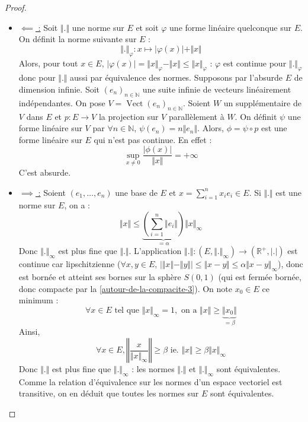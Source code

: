 	\begin{proof}
		\begin{itemize}
			\item \underline{$\impliedby$ :} Soit $\Vert . \Vert$ une norme sur $E$ et soit $\varphi$ une forme linéaire quelconque sur $E$. On définit la norme suivante sur $E$ :
			\[ \Vert . \Vert_{\varphi} : x \mapsto \vert \varphi(x) \vert + \Vert x \Vert \]
			Alors, pour tout $x \in E$, $\vert \varphi(x) \vert = \Vert x \Vert_{\varphi} - \Vert x \Vert \leq \Vert x \Vert_{\varphi}$ : $\varphi$ est continue pour $\Vert . \Vert_{\varphi}$ donc pour $\Vert . \Vert$ aussi par équivalence des normes.
			\newpar
			Supposons par l'absurde $E$ de dimension infinie. Soit $(e_n)_{n \in \mathbb{N}}$ une suite infinie de vecteurs linéairement indépendantes. On pose $V = \operatorname{Vect}(e_n)_{n \in \mathbb{N}}$. Soient $W$ un supplémentaire de $V$ dans $E$ et $p : E \rightarrow V$ la projection sur $V$ parallèlement à $W$. On définit $\psi$ une forme linéaire sur $V$ par $\forall n \in \mathbb{N}$, $\psi (e_n) = n \Vert e_n \Vert$. Alors, $\phi = \psi \circ p$ est une forme linéaire sur $E$ qui n'est pas continue. En effet :
			\[ \sup_{x \neq 0} \frac{\vert \phi(x) \vert}{\Vert x \Vert} = +\infty \]
			C'est absurde.
			\item \underline{$\implies$ :}
			Soient $(e_1, \dots, e_n)$ une base de $E$ et $x = \sum_{i=1}^n x_i e_i \in E$. Si $\Vert . \Vert$ est une norme sur $E$, on a :
			\[ \Vert x \Vert \leq \underbrace{\left( \sum_{i=1}^n \Vert e_i \Vert \right)}_{= \alpha} \Vert x \Vert_\infty \]
			Donc $\Vert . \Vert_\infty$ est plus fine que $\Vert . \Vert$.
			\newpar
			L'application $\Vert . \Vert : (E, \Vert . \Vert_\infty) \rightarrow (\mathbb{R}^+, \vert . \vert)$ est continue car lipschitzienne ($\forall x, y \in E, \, \vert \Vert x \Vert - \Vert y \Vert \vert \leq \Vert x - y \Vert \leq \alpha \Vert x - y \Vert_\infty$), donc est bornée et atteint ses bornes sur la sphère $S(0,1)$ (qui est fermée bornée, donc compacte par la \cref{autour-de-la-compacite-3}). On note $x_0 \in E$ ce minimum :
			\[ \forall x \in E \text{ tel que } \Vert x \Vert_\infty = 1, \text{ on a } \Vert x \Vert \geq \underbrace{\Vert x_0 \Vert}_{= \beta} \]
			Ainsi,
			\[ \forall x \in E, \left\Vert \frac{x}{\Vert x \Vert_\infty} \right\Vert \geq \beta \text{ ie. } \Vert x \Vert \geq \beta \Vert x \Vert_\infty \]
			Donc $\Vert . \Vert$ est plus fine que $\Vert . \Vert_\infty$ : les normes $\Vert . \Vert$ et $\Vert . \Vert_\infty$ sont équivalentes. Comme la relation d'équivalence sur les normes d'un espace vectoriel est transitive, on en déduit que toutes les normes sur $E$ sont équivalentes.
		\end{itemize}
	\end{proof}
	
